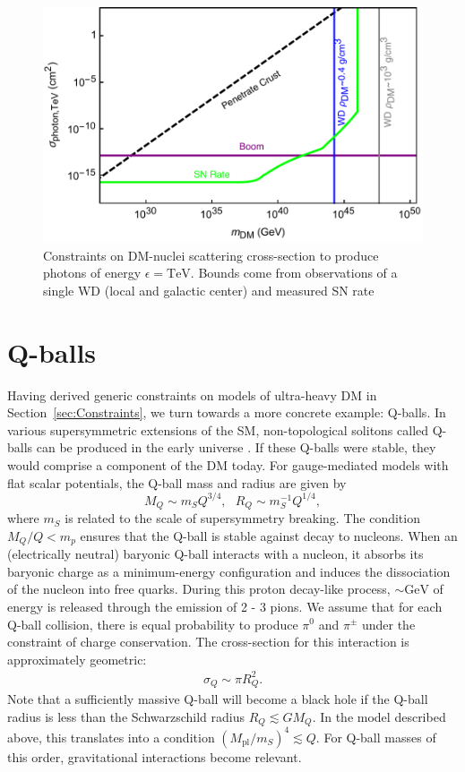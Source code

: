 \documentclass[twocolumn,preprintnumbers,amsmath,amssymb,prl, superscriptaddress]{revtex4}
\begin{document}
\begin{figure}
\includegraphics[scale=.45]{transitobservation.pdf}
\caption{Constraints on DM-nuclei scattering cross-section to produce photons of energy $\epsilon = \text{TeV}$. Bounds come from observations of a single WD (local and galactic center) and measured SN rate}
\label{fig:transitclasses}
\end{figure}

\section{Q-balls}
\label{sec:QBalls}

Having derived generic constraints on models of ultra-heavy DM in Section~\ref{sec:Constraints}, we turn towards a more concrete example: Q-balls.
In various supersymmetric extensions of the SM, non-topological solitons called Q-balls can be produced in the early universe \cite{Coleman:1985ki, Kusenko:1997si}.
If these Q-balls were stable, they would comprise a component of the DM today.
For gauge-mediated models with flat scalar potentials, the Q-ball mass and radius are given by
\begin{equation}
\label{eq:Qballprop}
M_Q \sim m_S Q^{3/4}, ~~~ R_Q \sim m_S^{-1} Q^{1/4},
\end{equation}
where $m_S$ is related to the scale of supersymmetry breaking.
The condition $M_Q/Q < m_p$ ensures that the Q-ball is stable against decay to nucleons.
When an (electrically neutral) baryonic Q-ball interacts with a nucleon, it absorbs its baryonic charge as a minimum-energy configuration and induces the dissociation of the nucleon into free quarks.
During this proton decay-like process, $\sim \text{GeV}$ of energy is released through the emission of 2 - 3 pions.
We assume that for each Q-ball collision, there is equal probability to produce $\pi^0$ and $\pi^\pm$ under the constraint of charge conservation.
The cross-section for this interaction is approximately geometric:
\begin{align}
\sigma_Q \sim \pi R_Q^2.
\end{align}
Note that a sufficiently massive Q-ball will become a black hole if the Q-ball radius is less than the Schwarzschild radius $R_Q \lesssim G M_Q$.
In the model described above, this translates into a condition $(M_\text{pl}/m_S)^4 \lesssim Q$.
For Q-ball masses of this order, gravitational interactions become relevant.
\end{document}
